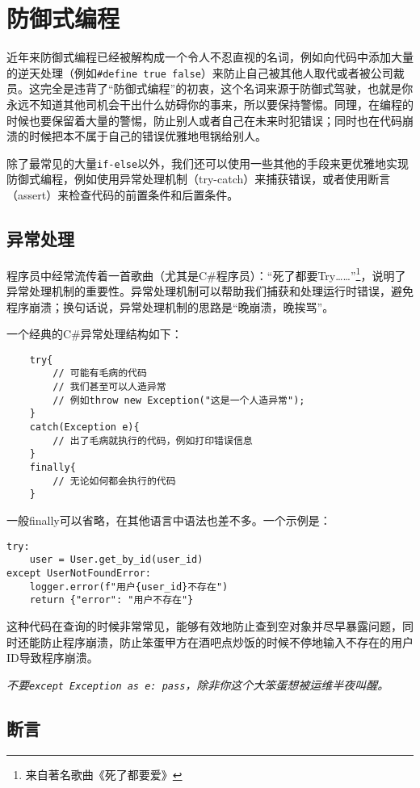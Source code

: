\documentclass[../main.tex]{subfiles}
\begin{document}
\section{防御式编程}

近年来防御式编程已经被解构成一个令人不忍直视的名词，例如向代码中添加大量的逆天处理（例如\texttt{\#define true false}）来防止自己被其他人取代或者被公司裁员。这完全是违背了“防御式编程”的初衷，这个名词来源于防御式驾驶，也就是你永远不知道其他司机会干出什么妨碍你的事来，所以要保持警惕。同理，在编程的时候也要保留着大量的警惕，防止别人或者自己在未来时犯错误；同时也在代码崩溃的时候把本不属于自己的错误优雅地甩锅给别人。

除了最常见的大量\texttt{if-else}以外，我们还可以使用一些其他的手段来更优雅地实现防御式编程，例如使用异常处理机制（try-catch）来捕获错误，或者使用断言（assert）来检查代码的前置条件和后置条件。

\subsection{异常处理}

程序员中经常流传着一首歌曲（尤其是C\#程序员）：“死了都要Try……”\footnote{来自著名歌曲《死了都要爱》}，说明了异常处理机制的重要性。异常处理机制可以帮助我们捕获和处理运行时错误，避免程序崩溃；换句话说，异常处理机制的思路是“晚崩溃，晚挨骂”。

一个经典的C\#异常处理结构如下：
\begin{verbatim}
    try{
        // 可能有毛病的代码
        // 我们甚至可以人造异常
        // 例如throw new Exception("这是一个人造异常");
    }
    catch(Exception e){
        // 出了毛病就执行的代码，例如打印错误信息
    }
    finally{
        // 无论如何都会执行的代码
    }
\end{verbatim}

一般finally可以省略，在其他语言中语法也差不多。一个示例是：
\begin{verbatim}
try:
    user = User.get_by_id(user_id)
except UserNotFoundError:
    logger.error(f"用户{user_id}不存在")
    return {"error": "用户不存在"}
\end{verbatim}

这种代码在查询的时候非常常见，能够有效地防止查到空对象并尽早暴露问题，同时还能防止程序崩溃，防止笨蛋甲方在酒吧点炒饭的时候不停地输入不存在的用户ID导致程序崩溃。

\emph{不要\texttt{except Exception as e: pass}，除非你这个大笨蛋想被运维半夜叫醒。}

\subsection{断言}
\end{document}
